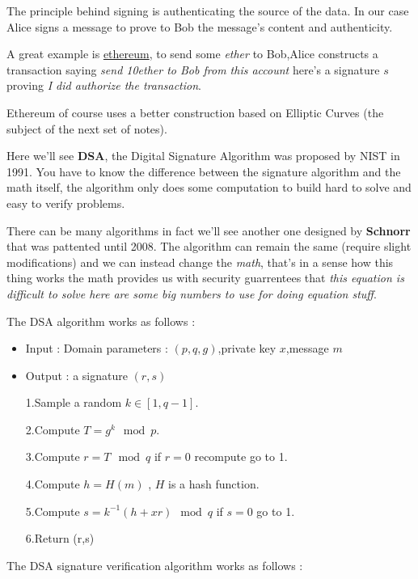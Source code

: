 \documentclass[11pt]{article}
\begin{document}
The principle behind signing is authenticating the source of the data.
In our case Alice signs a message to prove to Bob the message's content
and authenticity.

A great example is \href{https://ethereum.org}{ethereum}, to send some
\emph{ether} to Bob,Alice constructs a transaction saying \emph{send
10ether to Bob from this account} here's a signature \(s\) proving
\emph{I did authorize the transaction}.

Ethereum of course uses a better construction based on Elliptic Curves
(the subject of the next set of notes).

Here we'll see \textbf{DSA}, the Digital Signature Algorithm was
proposed by NIST in 1991. You have to know the difference between the
signature algorithm and the math itself, the algorithm only does some
computation to build hard to solve and easy to verify problems.

There can be many algorithms in fact we'll see another one designed by
\textbf{Schnorr} that was pattented until 2008. The algorithm can remain
the same (require slight modifications) and we can instead change the
\emph{math}, that's in a sense how this thing works the math provides us
with security guarrentees that \emph{this equation is difficult to solve
here are some big numbers to use for doing equation stuff}.

The DSA algorithm works as follows :

\begin{itemize}
\item
  Input : Domain parameters : \((p,q,g)\),private key \(x\),message
  \(m\)
\item
  Output : a signature \((r,s)\)

  1.Sample a random \(k \in [1,q-1]\).

  2.Compute \(T = g^k \mod p\).

  3.Compute \(r = T \mod q\) if \(r=0\) recompute go to 1.

  4.Compute \(h = H(m)\) , \(H\) is a hash function.

  5.Compute \(s = k^{-1} ( h + xr) \mod q\) if \(s=0\) go to 1.

  6.Return (r,s)
\end{itemize}

The DSA signature verification algorithm works as follows :
\end{document}
